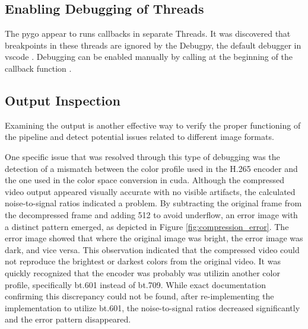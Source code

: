 \subsection{Enabling Debugging of Threads}
The \gls{pygo} appear to runs callbacks in separate Threads.
It was discovered that breakpoints in these threads are ignored by the Debugpy, the default debugger in \gls{vscode} \cite{microsoftDebugpyDebuggerPython2023}\cite{visualstudiocodeDebuggingConfigurationsPython2023}.
Debugging can be enabled manually by calling  at the beginning of the callback function \cite{nadigAnswerDebugNot2019}.


\subsection{Output Inspection}
Examining the output is another effective way to verify the proper functioning of the pipeline and detect potential issues related to different image formats.

One specific issue that was resolved through this type of debugging was the detection of a mismatch between the color profile used in the H.265 encoder and the one used in the color space conversion in \gls{cuda}.
Although the compressed video output appeared visually accurate with no visible artifacts, the calculated noise-to-signal ratios indicated a problem.
By subtracting the original frame from the decompressed frame and adding 512 to avoid underflow, an error image with a distinct pattern emerged, as depicted in Figure \ref{fig:compression_error}.
The error image showed that where the original image was bright, the error image was dark, and vice versa.
This observation indicated that the compressed video could not reproduce the brightest or darkest colors from the original video.
It was quickly recognized that the encoder was probably was utilizin another color profile, specifically bt.601 instead of bt.709.
While exact documentation confirming this discrepancy could not be found, after re-implementing the \cuda implementation to utilize bt.601, the noise-to-signal ratios decreased significantly and the error pattern disappeared.

